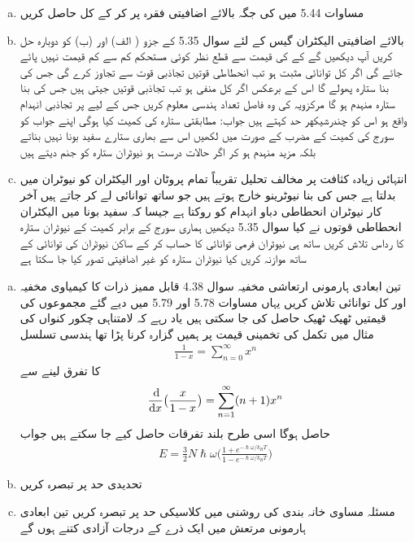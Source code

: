 \begin{enumerate}[a.]
\item
مساوات 5.44 میں  کی جگہ بالائے اضافیتی فقرہ  پر کر کے  كل حاصل کریں 
\item
بالائے اضافیتی الیکٹران گیس کے لئے سوال 5.35 کے جزو ( الف) اور (ب) کو دوبارہ حل کریں آپ دیکھیں گے کے  کی قیمت سے قطع نظر کوئی مستحکم کم سے كم قیمت نہیں پائے جائے گی اگر کل توانائی مثبت ہو تب انحطاطی قوتیں تجاذبی قوت سے تجاوز کرے گی جس کی بنا ستارہ پھولے گا اس کے برعکس اگر کل منفی ہو تب تجاذبی  قوتيں  جیتی ہیں جس کی بنا ستارہ منہدم ہو گا مرکزویہ کی وہ فاصل تعداد ہندسی معلوم کریں جس کے لیے  پر تجاذبی انہدام واقع  ہو اس کو چندرشیكهر حد کہتے ہیں جواب:  مطابقتی ستارہ کی کمیت کیا ہوگی اپنے جواب کو سورج کی کمیت کے مضرب کے صورت میں لکھیں اس سے بھاری ستارے  سفید بونا نہیں بناتے بلکہ مزید منہدم ہو کر اگر حالات درست ہو نیوٹران ستارہ کو جنم دیتے ہیں 
\item
انتہائی زیادہ کثافت پر مخالف  تحلیل  تقریباً تمام پروٹان اور الیکٹران کو نیوٹران میں بدلتا ہے جس کی بنا نیوٹرینو خارج ہوتے ہیں جو ساتھ توانائی لے کر جاتے ہیں آخر کار نیوٹران انحطاطی دباو انہدام کو روکتا ہے جیسا کہ سفید بونا میں الیکٹران انحطاطی قوتوں نے کیا سوال 5.35 دیکھیں ہماری سورج کے برابر کمیت کے نیوٹران ستارہ کا رداس تلاش کریں ساتھ ہی نیوٹران فرمی توانائی کا حساب کر کے ساکن نیوٹران کی توانائی کے ساتھ موازنہ کریں کیا نیوٹران ستارہ کو غیر اضافیتی تصور کیا جا سکتا ہے 
\end{enumerate}
\begin{enumerate}[a.]
\item
تین ابعادی ہارمونی ارتعاشی مخفیہ سوال
4.38 قابل ممیز ذرات کا کیمیاوی مخفیہ اور کل توانائی تلاش کریں یہاں مساوات 5.78 اور 5.79 میں دیے گئے مجموعوں کی قیمتیں ٹھیک ٹھیک حاصل کی جا سکتی ہیں یاد رہے کہ لامتناہی چکور کنواں کی مثال میں تکمل کی تخمینی قیمت پر ہمیں گزارہ کرنا پڑا تھا ہندسی تسلسل 
\begin{align}
\frac{1}{1 - x} = \sum_{n = 0}^{\infty} x^{n}
\end{align}
کا تفرق لینے سے 
\begin{align*}
\frac{\dif}{\dif x} \big ( \frac{x}{1 - x} \big ) = \sum_{n = 1}^{\infty} (n + 1) x^{n}
\end{align*}
حاصل ہوگا اسی طرح بلند تفرقات حاصل کیے جا سکتے ہیں جواب 
\begin{align}
E = \frac{3}{2} N \hslash \omega \big ( \frac{1 + e^{- \hslash \omega / k_B T}}{1 - e^{- \hslash \omega / k_B T}} \big )
\end{align}
\item
تحدیدی حد  پر تبصرہ کریں 
\item
مسئلہ مساوی خانہ بندی کی روشنی میں کلاسیکی حد  پر تبصرہ کریں تین ابعادی  ہارمونی مرتعش میں ایک ذرے کے درجات  آزادی کتنے ہوں گے 
\end{enumerate}


